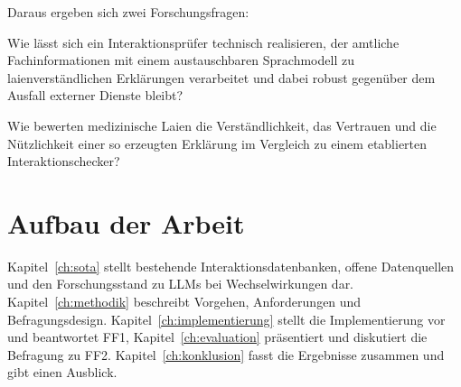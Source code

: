 Daraus ergeben sich zwei Forschungsfragen:

\begin{description}[leftmargin=2.6em, style=sameline, font=\normalfont\bfseries]
  \item[FF1] Wie lässt sich ein Interaktionsprüfer technisch realisieren, der amtliche Fachinformationen mit einem austauschbaren Sprachmodell zu laienverständlichen Erklärungen verarbeitet und dabei robust gegenüber dem Ausfall externer Dienste bleibt?
  \item[FF2] Wie bewerten medizinische Laien die Verständlichkeit, das Vertrauen und die Nützlichkeit einer so erzeugten Erklärung im Vergleich zu einem etablierten Interaktionschecker?
\end{description}

\section{Aufbau der Arbeit}

Kapitel~\ref{ch:sota} stellt bestehende Interaktionsdatenbanken, offene Datenquellen und den Forschungsstand zu LLMs bei Wechselwirkungen dar. Kapitel~\ref{ch:methodik} beschreibt Vorgehen, Anforderungen und Befragungsdesign. Kapitel~\ref{ch:implementierung} stellt die Implementierung vor und beantwortet FF1, Kapitel~\ref{ch:evaluation} präsentiert und diskutiert die Befragung zu FF2. Kapitel~\ref{ch:konklusion} fasst die Ergebnisse zusammen und gibt einen Ausblick.
